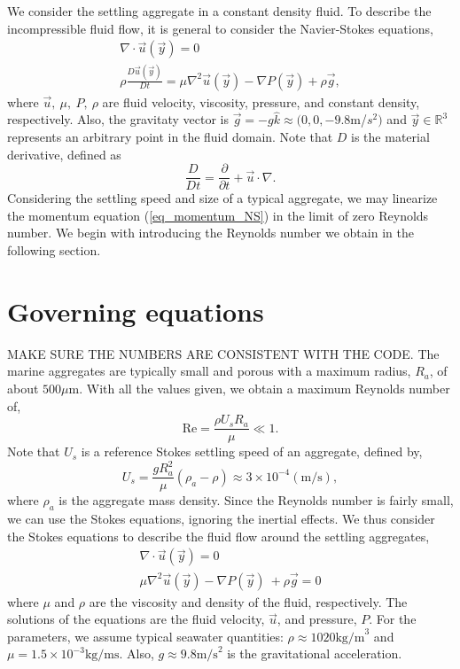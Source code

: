 We consider the settling aggregate in a constant density fluid. To describe the incompressible fluid flow, it is general to consider the Navier-Stokes equations,
\begin{align}
\nabla \cdot \vec{u}(\vec{y}) = 0 
\\
\rho \frac{D\vec{u}(\vec{y})}{Dt}
 =\mu \nabla^2 \vec{u}(\vec{y}) - \nabla P(\vec{y}) + \rho  \vec{g} ,
\label{eq_momentum_NS}
\end{align}
where $\vec{u}, \ \mu, \ P, \ \rho$ are fluid velocity, viscosity, pressure, and constant density, respectively. Also, the gravitaty vector is $\vec{g} = - g\hat{k} \approx (0,0,-9.8$m/$s^2)$ and $\vec{y} \in \mathbb{R}^3$ represents an arbitrary point in the fluid domain. 
Note that $D$ is the material derivative, defined as
\begin{equation}
\frac{D}{Dt} = \frac{\partial}{\partial t} + \vec{u}\cdot \nabla.
\end{equation}
Considering the settling speed and size of a typical aggregate, we may linearize the momentum equation (\ref{eq_momentum_NS}) in the limit of zero Reynolds number. We begin with introducing the Reynolds number we obtain in the following section. 
\section{Governing equations}
{\color{blue} MAKE SURE THE NUMBERS ARE CONSISTENT WITH THE CODE.}
The marine aggregates are typically small and porous with a maximum radius, $R_a$, of about $ 500 \mu \text{m}$.
With all the values given, we obtain a maximum Reynolds number of,
\begin{equation*}
    \text{Re} = \frac{\rho U_s R_a}{\mu} 
	\ll 1.
\end{equation*}
Note that $U_s$ is a reference Stokes settling speed of an aggregate, defined by, 
\begin{equation}
    U_s =  \frac{gR_a^2}{\mu} (\rho_a-\rho) \approx 3 \times 10^{-4} ({\text{m/s}}),
	\label{eq_U_s}
\end{equation}
where $\rho_a$ is the aggregate mass density. Since the Reynolds number is fairly small, we can use the Stokes equations, ignoring the inertial effects.
 We thus consider the Stokes equations to describe the fluid flow around the settling aggregates,
 \begin{align}
	\nabla \cdot \vec{u} (\vec{y}) = 0  \label{eq_conti2}
	\\
	\mu \nabla^2 \vec{u} (\vec{y})   - \nabla P(\vec{y}) \ + \rho  \vec{g} = 0
	\label{eq_stokes2}
\end{align}
where $\mu$ and $\rho$ are the viscosity and density of the fluid, respectively. The solutions of the equations are the fluid velocity, $\vec{u}$, and pressure, $P$. For the parameters, we assume typical seawater quantities:  $\rho \approx 1020 \text{kg/m}^3$ and $\mu = 1.5 \times 10^{-3}\text{kg}/\text{ms}$. Also, $g \approx 9.8 \text{m/s}^2$ is the gravitational acceleration.
%
%
%
